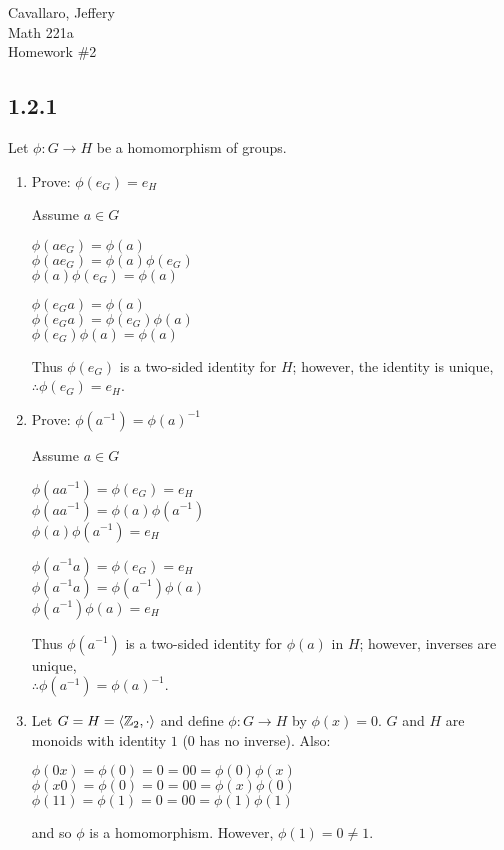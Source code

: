 \documentclass[letterpaper,12pt,fleqn]{article}
\newcommand{\p}{\phi}
\newcommand{\bas}[2]{\left<#1,#2\right>}
\begin{document}
Cavallaro, Jeffery \\
Math 221a \\
Homework \#2

\bigskip

\subsection*{1.2.1}

Let $\p:G\to H$ be a homomorphism of groups.
\begin{enumerate}[label=\alph*)]
\item Prove: $\p(e_G)=e_H$

  Assume $a\in G$

  \begin{minipage}[t]{3in}
    $\p(ae_G)=\p(a)$ \\
    $\p(ae_G)=\p(a)\p(e_G)$ \\
    $\p(a)\p(e_G)=\p(a)$
  \end{minipage}
  \begin{minipage}[t]{3in}
    $\p(e_Ga)=\p(a)$ \\
    $\p(e_Ga)=\p(e_G)\p(a)$ \\
    $\p(e_G)\p(a)=\p(a)$
  \end{minipage}

  \bigskip
  
  Thus $\p(e_G)$ is a two-sided identity for $H$; however, the identity is
  unique, \\
  $\therefore\p(e_G)=e_H$.

  \item Prove: $\p(a^{-1})=\p(a)^{-1}$

  Assume $a\in G$

  \begin{minipage}[t]{3in}
    $\p(aa^{-1})=\p(e_G)=e_H$ \\
    $\p(aa^{-1})=\p(a)\p(a^{-1})$ \\
    $\p(a)\p(a^{-1})=e_H$
  \end{minipage}
  \begin{minipage}[t]{3in}
    $\p(a^{-1}a)=\p(e_G)=e_H$ \\
    $\p(a^{-1}a)=\p(a^{-1})\p(a)$ \\
    $\p(a^{-1})\p(a)=e_H$
  \end{minipage}

  \bigskip
  
  Thus $\p(a^{-1})$ is a two-sided identity for $\p(a)$ in $H$; however,
  inverses are unique, \\
  $\therefore\p(a^{-1})=\p(a)^{-1}$.

\item Let $G=H=\bas{\Z_2}{\cdot}$ and define $\p:G\to H$ by $\p(x)=0$. $G$
  and $H$ are monoids with identity $1$ (0 has no inverse). Also:
  
  $\p(0x)=\p(0)=0=00=\p(0)\p(x)$ \\
  $\p(x0)=\p(0)=0=00=\p(x)\p(0)$ \\
  $\p(11)=\p(1)=0=00=\p(1)\p(1)$

  and so $\p$ is a homomorphism. However, $\p(1)=0\ne1$.
\end{enumerate}
\end{document}
